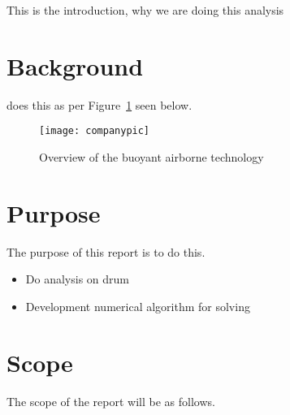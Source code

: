 \label{chapt:intro}

This is the introduction, why we are doing this analysis

\section{Background} %

\Company does this as per Figure~\ref{fig:companypic} seen below.

\begin{figure}[!htbp]
    \centering
    \texttt{[image: companypic]}
    \caption{Overview of the buoyant airborne technology}
    \label{fig:companypic}
\end{figure}


\section{Purpose}
The purpose of this report is to do this.
\begin{itemize}
    \item Do analysis on drum
    \item Development numerical algorithm for solving
\end{itemize}


\section{Scope} %

The scope of the report will be as follows.
